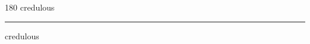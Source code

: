 
\begin{frame}
\begin{center}
\begin{turn}{180}
{\fontsize{2.5cm}{1em}\selectfont credulous}
\end{turn}
\vspace{1em}\par  
\hrule
\vspace{1em}\par  
{\fontsize{2.5cm}{1em}\selectfont credulous}
\end{center}
\end{frame}
